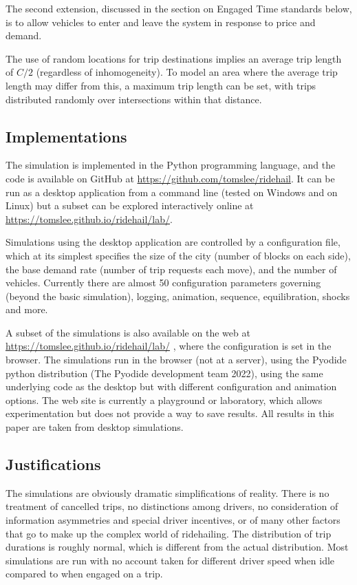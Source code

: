 \documentclass[
  letterpaper,
  DIV=11,
  numbers=noendperiod]{scrartcl}
\begin{document}
The second extension, discussed in the section on Engaged Time standards
below, is to allow vehicles to enter and leave the system in response to
price and demand.

The use of random locations for trip destinations implies an average
trip length of \(C/2\) (regardless of inhomogeneity). To model an area
where the average trip length may differ from this, a maximum trip
length can be set, with trips distributed randomly over intersections
within that distance.

\hypertarget{implementation}{%
\subsection{Implementations}\label{implementation}}

The simulation is implemented in the Python programming language, and
the code is available on GitHub at
\url{https://github.com/tomslee/ridehail}. It can be run as a desktop
application from a command line (tested on Windows and on Linux) but a
subset can be explored interactively online at
\url{https://tomslee.github.io/ridehail/lab/}.

Simulations using the desktop application are controlled by a
configuration file, which at its simplest specifies the size of the city
(number of blocks on each side), the base demand rate (number of trip
requests each move), and the number of vehicles. Currently there are
almost 50 configuration parameters governing (beyond the basic
simulation), logging, animation, sequence, equilibration, shocks and
more.

A subset of the simulations is also available on the web at
\url{https://tomslee.github.io/ridehail/lab/} , where the configuration
is set in the browser. The simulations run in the browser (not at a
server), using the Pyodide python distribution (The Pyodide development
team 2022), using the same underlying code as the desktop but with
different configuration and animation options. The web site is currently
a playground or laboratory, which allows experimentation but does not
provide a way to save results. All results in this paper are taken from
desktop simulations.

\hypertarget{justifications}{%
\subsection{Justifications}\label{justifications}}

The simulations are obviously dramatic simplifications of reality. There
is no treatment of cancelled trips, no distinctions among drivers, no
consideration of information asymmetries and special driver incentives,
or of many other factors that go to make up the complex world of
ridehailing. The distribution of trip durations is roughly normal, which
is different from the actual distribution. Most simulations are run with
no account taken for different driver speed when idle compared to when
engaged on a trip.
\end{document}
